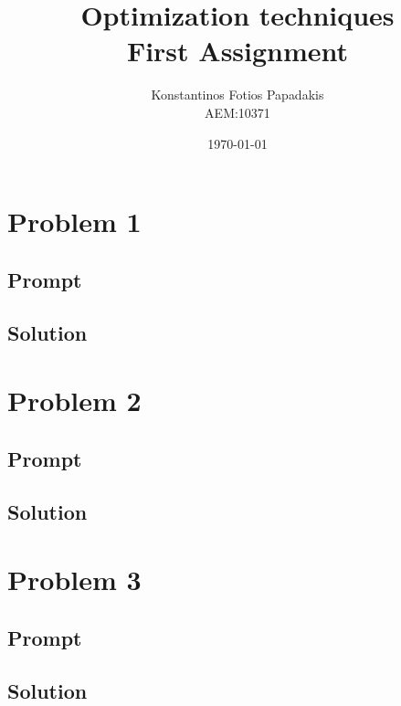 \documentclass[twocolumn]{report}
\begin{document}
\title{\Huge \bfseries Optimization techniques \\ First Assignment} %
\author{Konstantinos Fotios Papadakis\vspace{0.5cm} \\  AEM:10371} %
\date{\today}
\maketitle

\tableofcontents

\chapter{Problem 1}
\section{Prompt}

\section{Solution}


\chapter{Problem 2}
\section{Prompt}

\section{Solution}


\chapter{Problem 3}
\section{Prompt}

\section{Solution}

\end{document}
